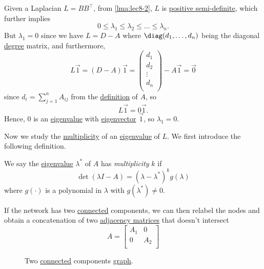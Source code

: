 \begin{remark}\label{rmk:property-of-Laplacian}
	Given a Laplacian \(L = B B^{\top}\), from \autoref{lma:lec8-2}, \(L\) is \hyperref[def:positive-semi-definite]{positive semi-definite}, which further implies
	\[
		0 \leq \lambda_1 \leq \lambda_2 \leq \ldots \leq \lambda_n.
	\]
	But \(\lambda_1 = 0\) since we have \(L = D-A\) where \(\diag(d_1, \ldots , d_n)\) being the diagonal \hyperref[def:degree]{degree} matrix, and furthermore,
	\[
		L \vec{1} = (D - A)\vec{1} = \begin{pmatrix}
			d_1    \\
			d_2    \\
			\vdots \\
			d_n    \\
		\end{pmatrix} - A\vec{1} = \vec{0}
	\]
	since \(d_{i} = \sum_{j=1}^{n} A_{ij}\) from the \hyperref[def:adjacency-matrix]{definition} of \(A\), so
	\[
		L \vec{1} = 0 \vec{1}.
	\]
	Hence, \(0\) is an \hyperref[def:eigenvalue]{eigenvalue} with \hyperref[def:eigenvector]{eigenvector} \(\vec{1}\), so \(\lambda _1=0\).
\end{remark}

Now we study the \hyperref[def:multiplicity]{multiplicity} of an \hyperref[def:eigenvalue]{eigenvalue} of \(L\). We first introduce the following definition.
\begin{definition}[Multiplicity]\label{def:multiplicity}
	We say the \hyperref[def:eigenvalue]{eigenvalue} \(\lambda ^{\ast} \) of \(A\) has \emph{multiplicity} \(k\) if
	\[
		\det(\lambda I - A) = (\lambda - \lambda ^{\ast} )^k g(\lambda )
	\]
	where \(g(\cdot)\) is a polynomial in \(\lambda\) with \(g(\lambda ^{\ast} )\neq 0\).
\end{definition}

If the network has two \hyperref[def:connected]{connected} components, we can then relabel the nodes and obtain a concatenation of two \hyperref[def:adjacency-matrix]{adjacency matrices} that doesn't intersect
\[
	A = \begin{bmatrix}
		A_1 & 0   \\
		0   & A_2 \\
	\end{bmatrix}
\]
\begin{figure}[H]
	\centering
	\caption{Two \hyperref[def:connected]{connected} components \hyperref[def:graph]{graph}.}
	\label{fig:two-component-graph}
\end{figure}

